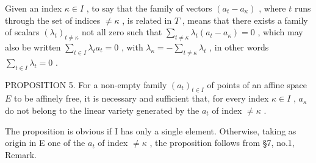Given an index \(\kappa \in I\) , to say that the family of vectors \((a_{t} - a_{\kappa})\) , where \(t\) runs through the set of indices \(\neq \kappa\) , is related in \(T\) , means that there exists a family of scalars \((\lambda_{t})_{t \neq \kappa}\) not all zero such that \(\sum_{t \neq \kappa} \lambda_{t}(a_{t} - a_{\kappa}) = 0\) , which may also be written \(\sum_{t \in I} \lambda_{t} a_{t} = 0\) , with \(\lambda_{\kappa} = -\sum_{t \neq \kappa} \lambda_{t}\) , in other words \(\sum_{t \in I} \lambda_{t} = 0\) .

PROPOSITION 5. For a non-empty family \((a_{t})_{t\in I}\) of points of an affine space \(E\) to be affinely free, it is necessary and sufficient that, for every index \(\kappa\in I\) , \(a_{\kappa}\) do not belong to the linear variety generated by the \(a_{t}\) of index \(\neq\kappa\) .

The proposition is obvious if I has only a single element. Otherwise, taking as origin in E one of the \(a_{t}\) of index \(\neq\kappa\) , the proposition follows from §7, no.1, Remark.

